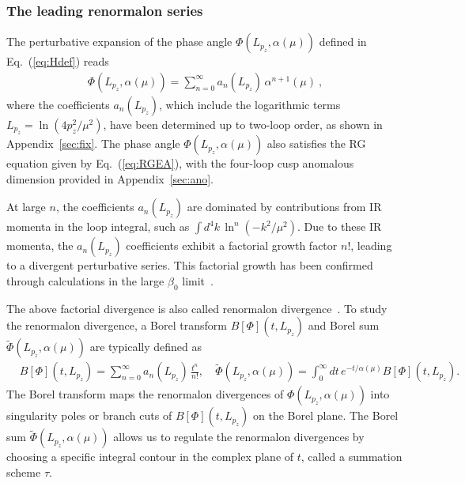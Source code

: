 \documentclass[a4paper,11pt]{article}
\begin{document}
\subsubsection{The leading renormalon series}
The perturbative expansion of the phase angle $\Phi(L_{p_z}, \alpha(\mu))$ defined in Eq.~(\ref{eq:Hdef}) reads
\begin{align}\label{eq:Phaseanglepert}
    \Phi(L_{p_z}, \alpha(\mu)) = \sum_{n=0}^{\infty} a_{n}\left(L_{p_z}\right) \, \alpha^{n+1}(\mu) \ ,
\end{align}
where the coefficients $a_{n}\left(L_{p_z}\right)$, which include the logarithmic terms $L_{p_z} =\ln(4p_z^2/\mu^2)$, have been determined up to two-loop order, as shown in Appendix~\ref{sec:fix}. The phase angle $\Phi(L_{p_z}, \alpha(\mu))$ also satisfies the RG equation given by Eq.~(\ref{eq:RGEA}), with the four-loop cusp anomalous dimension provided in Appendix~\ref{sec:ano}. 

At large $n$, the coefficients $a_{n}\left(L_{p_z}\right)$ are dominated by contributions from IR momenta in the loop integral, such as $\int d^4 k \, \ln^n\left(-k^2/\mu^2\right)$. Due to these IR momenta, the $a_{n}(L_{p_z})$ coefficients exhibit a factorial growth factor $n!$, leading to a divergent perturbative series. This factorial growth has been confirmed through calculations in the large $\beta_0$ limit~\cite{Liu:2023onm}. 

The above factorial divergence is also called renormalon divergence~\cite{Beneke:1994sw, Beneke:1998ui, Beneke:2000kc,Shifman:2013uka}. To study the renormalon divergence, a Borel transform $B[\Phi]\left(t,L_{p_z}\right)$ and Borel sum $\tilde \Phi(L_{p_z}, \alpha(\mu))$ are typically defined as
\begin{align}\label{eq:BorelTran}
    &B[\Phi]\left(t,L_{p_z}\right) = \sum_{n=0}^{\infty} a_{n}\left(L_{p_z}\right) \, \frac{t^n}{n!} ,\
    &\tilde \Phi(L_{p_z}, \alpha(\mu)) = \int_{0}^{\infty} d t \, e^{-t/\alpha(\mu)} B[\Phi]\left(t,L_{p_z}\right) .\
\end{align}
The Borel transform maps the renormalon divergences of $\Phi(L_{p_z}, \alpha(\mu))$ into singularity poles or branch cuts of $B[\Phi]\left(t, L_{p_z}\right)$ on the Borel plane. The Borel sum $\tilde \Phi(L_{p_z}, \alpha(\mu))$ allows us to regulate the renormalon divergences by choosing a specific integral contour in the complex plane of $t$, called a summation scheme $\tau$. 
\end{document}
